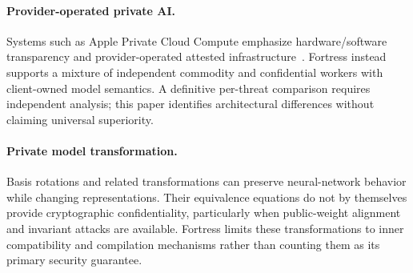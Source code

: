 \paragraph{Provider-operated private AI.}
Systems such as Apple Private Cloud Compute emphasize hardware/software transparency and provider-operated attested infrastructure~\cite{apple-pcc}. Fortress instead supports a mixture of independent commodity and confidential workers with client-owned model semantics. A definitive per-threat comparison requires independent analysis; this paper identifies architectural differences without claiming universal superiority.

\paragraph{Private model transformation.}
Basis rotations and related transformations can preserve neural-network behavior while changing representations. Their equivalence equations do not by themselves provide cryptographic confidentiality, particularly when public-weight alignment and invariant attacks are available. Fortress limits these transformations to inner compatibility and compilation mechanisms rather than counting them as its primary security guarantee.
